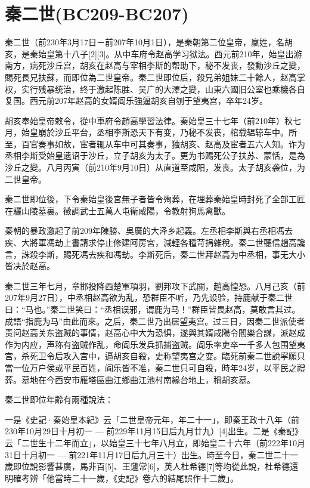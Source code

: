 
\section{秦二世\tiny(BC209-BC207)}

秦二世（前230年3月17日－前207年10月1日），是秦朝第二位皇帝，嬴姓，名胡亥，是秦始皇第十八子[2][3]。从中车府令赵高学习狱法。西元前210年，始皇出游南方，病死沙丘宫，胡亥在赵高与宰相李斯的帮助下，秘不发丧，發動沙丘之變，賜死長兄扶蘇，而即位為二世皇帝。秦二世即位后，殺兄弟姐妹二十餘人，赵高掌权，实行残暴统治，终于激起陈胜、吴广的大澤之變，山東六國旧公室也乘機各自复国。西元前207年赵高的女婿阎乐強逼胡亥自刎于望夷宫，卒年24岁。

胡亥奉始皇帝敕令，從中車府令趙高學習法律。秦始皇三十七年（前210年）秋七月，始皇崩於沙丘平台，丞相李斯恐天下有变，乃秘不发丧，棺载辒辌车中。所至，百官奏事如故，宦者辄从车中可其奏事，独胡亥、赵高及宦者五六人知。诈为丞相李斯受始皇遗诏于沙丘，立子胡亥为太子。更为书赐死公子扶苏、蒙恬，是為沙丘之變。八月丙寅（前210年9月10日）从直道至咸阳，发丧。太子胡亥袭位，为二世皇帝。

秦二世即位後，下令秦始皇後宮無子者皆令殉葬，在埋葬秦始皇時封死了全部工匠在驪山陵墓裏。徵調武士五萬人屯衛咸陽，令教射狗馬禽獸。

秦朝的暴政激起了前209年陳勝、吳廣的大泽乡起義。左丞相李斯與右丞相馮去疾、大將軍馮劫上書請求停止修建阿房宮，減輕各種苛捐雜稅。秦二世聽信趙高讒言，誅殺李斯，賜死馮去疾和馮劫。李斯死后，秦二世拜赵高为中丞相，事无大小皆决於赵高。

秦二世三年七月，章邯投降西楚軍項羽，劉邦攻下武關，趙高惶恐。八月己亥（前207年9月27日），中丞相赵高欲为乱，恐群臣不听，乃先设验，持鹿献于秦二世曰：“马也。”秦二世笑曰：“丞相误邪，谓鹿为马！”群臣皆畏赵高，莫敢言其过。成語“指鹿为马”由此而來。之后，秦二世乃出居望夷宫。过三日，因秦二世派使者责问赵高关东盗贼的事情，赵高心中大为恐惧，遂與其婿咸陽令閻樂合謀，派赵成作为内应，声称有盗贼作乱，命阎乐发兵抓捕盗贼。阎乐率吏卒一千多人包围望夷宫，杀死卫令后攻入宫中，逼胡亥自殺，史称望夷宫之变。臨死前秦二世說寜願只當一位万户侯或平民百姓，阎乐皆不准，秦二世只可自殺，時年24岁，以平民之禮葬。墓地在今西安市雁塔區曲江鄉曲江池村南緣台地上，稱胡亥墓。


秦二世即位年齡有兩種說法：

一是《史記·秦始皇本紀》云「二世皇帝元年，年二十一」，即秦王政十八年（前230年10月29日十月初一 — 前229年11月15日后九月廿九）[4]出生。二是《秦記》云「二世生十二年而立」，以始皇三十七年八月立，即始皇二十六年（前222年10月31日十月初一 — 前221年11月17日后九月三十）出生。時至今日，秦二世二十一歲即位說影響甚廣，馬非百[5]、王蘧常[6]，英人杜希德[7]等均從此說，杜希德還明確考辨「他當時二十一歲，《史記》卷六的結尾誤作十二歲」。

